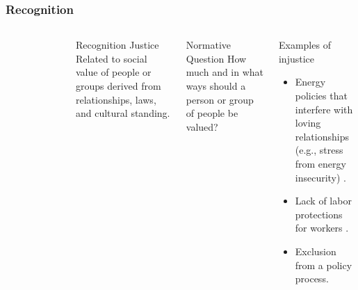 \begin{frame}
    \frametitle{Recognition}
    \begin{columns}
        \column[t]{3cm}
        \begin{figure}
            \centering
        \end{figure}
        \column[t]{7cm}
        \begin{block}{Recognition Justice}
            Related to social value of people or groups derived from
            relationships, laws, and cultural standing.
        \end{block}
        \begin{block}{Normative Question}
            How much and in what ways should a person or group of people be
            valued?
        \end{block}
        \begin{block}{Examples of injustice}
            \begin{itemize}
                \item Energy policies that interfere with loving relationships
                (e.g., stress from energy
                insecurity) \cite{van_uffelen_revisiting_2022}.
                \item Lack of labor protections for
                workers \cite{van_uffelen_revisiting_2022}.
                \item Exclusion from a policy process\cite{van_uffelen_revisiting_2022}.
            \end{itemize}
        \end{block}
    \end{columns}
    
\end{frame}

